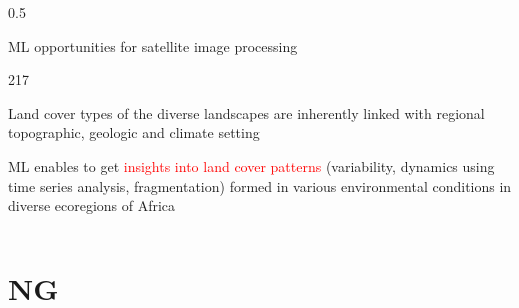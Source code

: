 \documentclass[pdflatex,compress,8pt,
	xcolor={dvipsnames,dvipsnames,svgnames,x11names,table},
	hyperref={colorlinks = true, breaklinks = true, urlcolor = NavyBlue, linkcolor=white, breaklinks = true}]{beamer}
\begin{document}
\begin{frame}
\begin{minipage}[0.4\textheight]{\textwidth}
\begin{columns}[T]
\begin{column}{0.5\textwidth}
\begin{alertblock}{ML opportunities for satellite image processing}
\begin{dinglist}{217}
     \item Land cover types of the diverse landscapes are inherently linked with regional topographic, geologic and climate setting
     \item ML enables to get \textcolor{red}{insights into land cover patterns} (variability, dynamics using time series analysis, fragmentation) formed in various environmental conditions in diverse ecoregions of Africa
\end{dinglist}
\end{alertblock}
\end{column}
\end{columns}
\end{minipage}
\end{frame}

\section{NG}
\end{document}

